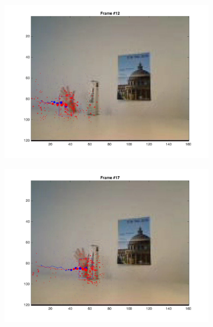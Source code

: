 \documentclass{ethz_report}
\begin{document}
\begin{figure}[h]
\begin{subfigure}[b]{.25\textwidth}
        \includegraphics[width=1\linewidth]{images/video2_observe_high_11}
    \end{subfigure}%
    \begin{subfigure}[b]{.25\textwidth}
        \centering
        \includegraphics[width=1\linewidth]{images/video2_observe_high_16}
    \end{subfigure}
    \begin{subfigure}[b]{.25\textwidth}
        \centering

\end{subfigure}
\end{figure}
\end{document}
